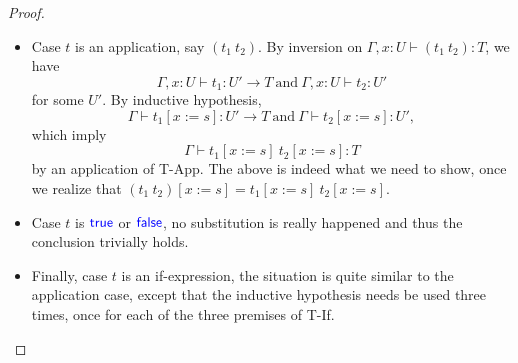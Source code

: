 \documentclass[11pt]{article}
\let\to\rightarrow
\newcommand{\kword}[1]{{\color{blue} \textsf{#1}}}
\newcommand{\True}{\kword{true}}
\newcommand{\False}{\kword{false}}
\begin{document}
\begin{proof}
\begin{itemize}
\begin{itemize}
        \end{itemize}
        \item Case $t$ is an application, say $(t_1~t_2)$.
        By inversion on $\Gamma,x:U \vdash (t_1~t_2):T$, we have
        $$\Gamma,x:U \vdash t_1:U' \to T~\text{and}~\Gamma,x:U \vdash t_2:U'$$
        for some $U'$.
        By inductive hypothesis, $$\Gamma \vdash t_1[x:=s]:U' \to T~\text{and}~\Gamma \vdash t_2[x:=s]:U',$$
        which imply $$\Gamma \vdash t_1[x:=s]~t_2[x:=s]:T$$
        by an application of T-App.
        The above is indeed what we need to show, once we realize that $(t_1~t_2)[x:=s]=t_1[x:=s]~t_2[x:=s]$.
        \item Case $t$ is $\True$ or $\False$, no substitution is really happened and thus the conclusion trivially holds.
        \item Finally, case $t$ is an if-expression, the situation is quite similar to the application case, except that the inductive hypothesis needs be used three times, once for each of the three premises of T-If.
    \end{itemize}
\end{proof}
\end{document}
